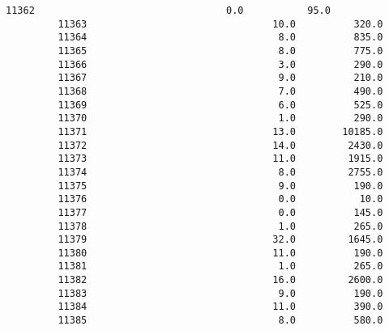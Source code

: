 \documentclass[11pt]{article}
\begin{document}
\begin{Verbatim}[commandchars=\\\{\}]
         11362                                 0.0           95.0   
         11363                                10.0          320.0   
         11364                                 8.0          835.0   
         11365                                 8.0          775.0   
         11366                                 3.0          290.0   
         11367                                 9.0          210.0   
         11368                                 7.0          490.0   
         11369                                 6.0          525.0   
         11370                                 1.0          290.0   
         11371                                13.0        10185.0   
         11372                                14.0         2430.0   
         11373                                11.0         1915.0   
         11374                                 8.0         2755.0   
         11375                                 9.0          190.0   
         11376                                 0.0           10.0   
         11377                                 0.0          145.0   
         11378                                 1.0          265.0   
         11379                                32.0         1645.0   
         11380                                11.0          190.0   
         11381                                 1.0          265.0   
         11382                                16.0         2600.0   
         11383                                 9.0          190.0   
         11384                                11.0          390.0   
         11385                                 8.0          580.0   
         

\end{Verbatim}
\end{document}
